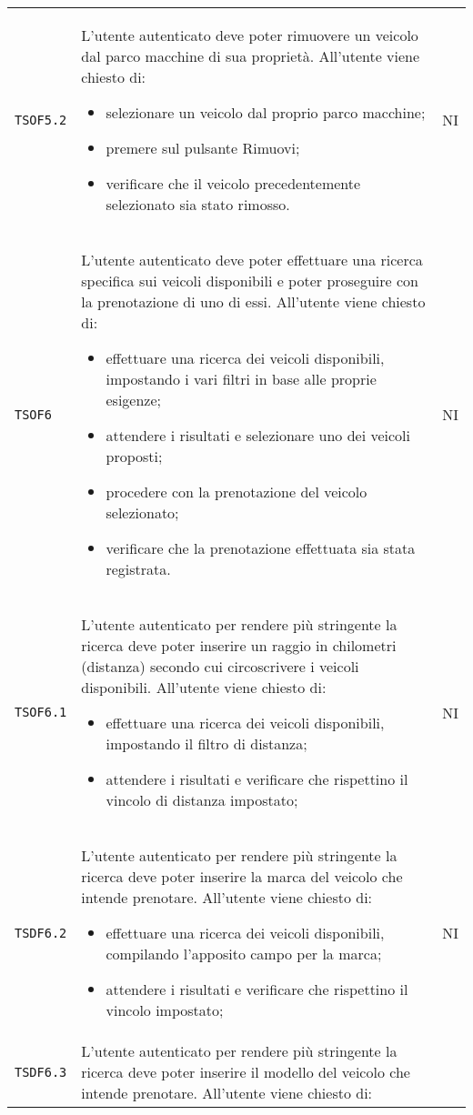 \begin{longtable}{ >{\centering}p{} >{\centering}p{}
			>{\centering}p{}}
		 \texttt{TSOF5.2}	&	L'utente autenticato deve poter rimuovere un veicolo dal parco macchine di sua proprietà. All'utente viene chiesto di:
		 \begin{itemize}
		 	\item selezionare un veicolo dal proprio parco macchine;
		 	\item premere sul pulsante Rimuovi;
		 	\item verificare che il veicolo precedentemente selezionato sia stato rimosso.
		 \end{itemize}	&	NI	\tabularnewline
		 \texttt{TSOF6}	&	L'utente autenticato deve poter effettuare una ricerca specifica sui veicoli disponibili e poter proseguire con la prenotazione di uno di essi. All'utente viene chiesto di:
		 \begin{itemize}
		 	\item effettuare una ricerca dei veicoli disponibili, impostando i vari filtri in base alle proprie esigenze;
		 	\item attendere i risultati e selezionare uno dei veicoli proposti;
		 	\item procedere con la prenotazione del veicolo selezionato;
		 	\item verificare che la prenotazione effettuata sia stata registrata.
		 \end{itemize}	&	NI	\tabularnewline
		 \texttt{TSOF6.1}	&	L'utente autenticato per rendere più stringente la ricerca deve poter inserire un raggio in chilometri (distanza) secondo cui circoscrivere i veicoli disponibili. All'utente viene chiesto di:
		 \begin{itemize}
		 	\item effettuare una ricerca dei veicoli disponibili, impostando il filtro di distanza;
		 	\item attendere i risultati e verificare che rispettino il vincolo di distanza impostato;
		 \end{itemize}	&	NI	\tabularnewline
		 \texttt{TSDF6.2}	&	L'utente autenticato per rendere più stringente la ricerca deve poter inserire la marca del veicolo che intende prenotare. All'utente viene chiesto di:
		 \begin{itemize}
		 	\item effettuare una ricerca dei veicoli disponibili, compilando l'apposito campo per la marca;
		 	\item attendere i risultati e verificare che rispettino il vincolo impostato;
		 \end{itemize}	&	NI	\tabularnewline
		  \texttt{TSDF6.3}	&	L'utente autenticato per rendere più stringente la ricerca deve poter inserire il modello del veicolo che intende prenotare. All'utente viene chiesto di:

\end{longtable}
